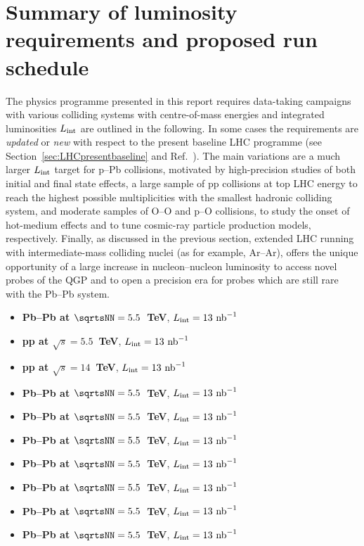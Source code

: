 \documentclass[../report.tex]{subfiles}
\begin{document}
\section{Summary of luminosity requirements and proposed run schedule}
\label{sec:schedule}

The physics programme presented in this report requires data-taking campaigns with various colliding systems with centre-of-mass energies and integrated luminosities $L_{\rm int}$ are outlined in the following. In some cases the requirements are {\it updated} or {\it new} with respect to the present baseline LHC programme (see Section~\ref{sec:LHCpresentbaseline} and Ref.~\cite{Abelevetal:2014cna}). The main variations are a much larger $L_{\rm int}$ target for p--Pb collisions, motivated by high-precision studies of both initial and final state effects, a large sample of pp collisions at top LHC energy to reach the highest possible multiplicities with the smallest hadronic colliding system, and moderate samples of O--O and p--O collisions, to study the onset of hot-medium effects and to tune cosmic-ray particle production models, respectively. Finally, as discussed in the previous section, extended LHC running with intermediate-mass colliding nuclei (as for example, Ar--Ar), offers the unique opportunity of a large increase in nucleon--nucleon luminosity to access novel probes of the QGP and to open a precision era for probes which are still rare with the Pb--Pb system.   

\begin{itemize}
\item {\bf Pb--Pb at $\sqrtsNN=5.5$~TeV}, $L_{\rm int}=13~{\rm nb}^{-1}$
\item {\bf pp at $\sqrt s=5.5$~TeV}, $L_{\rm int}=13~{\rm nb}^{-1}$

\item {\bf pp at $\sqrt s=14$~TeV}, $L_{\rm int}=13~{\rm nb}^{-1}$

\item {\bf Pb--Pb at $\sqrtsNN=5.5$~TeV}, $L_{\rm int}=13~{\rm nb}^{-1}$

\item {\bf Pb--Pb at $\sqrtsNN=5.5$~TeV}, $L_{\rm int}=13~{\rm nb}^{-1}$

\item {\bf Pb--Pb at $\sqrtsNN=5.5$~TeV}, $L_{\rm int}=13~{\rm nb}^{-1}$

\item {\bf Pb--Pb at $\sqrtsNN=5.5$~TeV}, $L_{\rm int}=13~{\rm nb}^{-1}$

\item {\bf Pb--Pb at $\sqrtsNN=5.5$~TeV}, $L_{\rm int}=13~{\rm nb}^{-1}$

\item {\bf Pb--Pb at $\sqrtsNN=5.5$~TeV}, $L_{\rm int}=13~{\rm nb}^{-1}$

\item {\bf Pb--Pb at $\sqrtsNN=5.5$~TeV}, $L_{\rm int}=13~{\rm nb}^{-1}$


\end{itemize}
\end{document}

